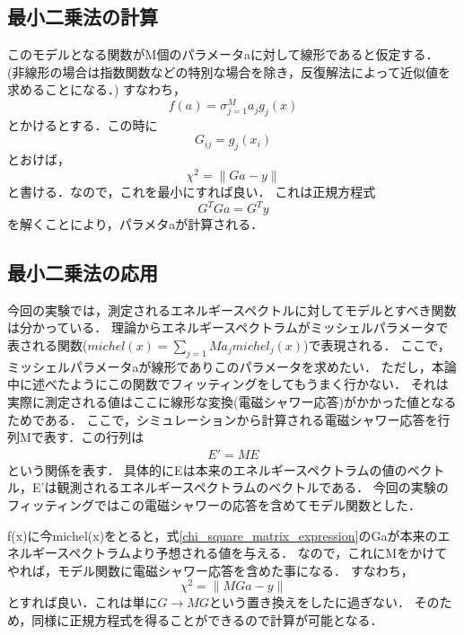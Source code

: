 \subsection{最小二乗法の計算}
このモデルとなる関数がM個のパラメータaに対して線形であると仮定する．
(非線形の場合は指数関数などの特別な場合を除き，反復解法によって近似値を求めることになる．)
すなわち，
\begin{equation}
  f(a) = \sigma_{j=1}^M a_j g_j(x)
\end{equation}
とかけるとする．この時に
\begin{equation}
  G_{ij} = g_j(x_i)
\end{equation}
とおけば，
\begin{equation}
  \chi^2 = \| Ga - y \|
  \label{chi_square_matrix_expression}
\end{equation}
と書ける．なので，これを最小にすれば良い．
これは正規方程式
\begin{equation}
  G^TGa=G^Ty
\end{equation}
を解くことにより，パラメタaが計算される．


\subsection{最小二乗法の応用}
今回の実験では，測定されるエネルギースペクトルに対してモデルとすべき関数は分かっている．
理論からエネルギースペクトラムがミッシェルパラメータで表される関数($michel(x)=\sum_{j=1}{M}a_j michel_j(x)$)で表現される．
ここで，ミッシェルパラメータaが線形でありこのパラメータを求めたい．
ただし，本論中に述べたようにこの関数でフィッティングをしてもうまく行かない．
それは実際に測定される値はここに線形な変換(電磁シャワー応答)がかかった値となるためである．
ここで，シミュレーションから計算される電磁シャワー応答を行列Mで表す．この行列は
\begin{eqnarray}
  E' = ME
\end{eqnarray}
という関係を表す．
具体的にEは本来のエネルギースペクトラムの値のベクトル，E'は観測されるエネルギースペクトラムのベクトルである．
今回の実験のフィッティングではこの電磁シャワーの応答を含めてモデル関数とした．

f(x)に今michel(x)をとると，式\eqref{chi_square_matrix_expression}のGaが本来のエネルギースペクトラムより予想される値を与える．
なので，これにMをかけてやれば，モデル関数に電磁シャワー応答を含めた事になる．
すなわち，
\begin{equation}
  \chi^2 = \| MGa - y \|
\end{equation}
とすれば良い．これは単に$G\rightarrow MG$という置き換えをしたに過ぎない．
そのため，同様に正規方程式を得ることができるので計算が可能となる．
